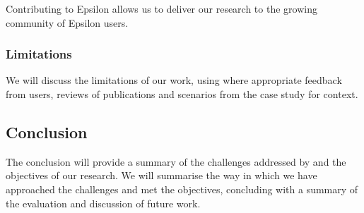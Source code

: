 Contributing to Epsilon allows us to deliver our research to the growing community \cite{kolovosthesis} of Epsilon users.

\subsubsection{Limitations}
We will discuss the limitations of our work, using where appropriate feedback from users, reviews of publications and scenarios from the case study for context.



\subsection{Conclusion}
The conclusion will provide a summary of the challenges addressed by and the objectives of our research. We will summarise the way in which we have approached the challenges and met the objectives, concluding with a summary of the evaluation and discussion of future work. 